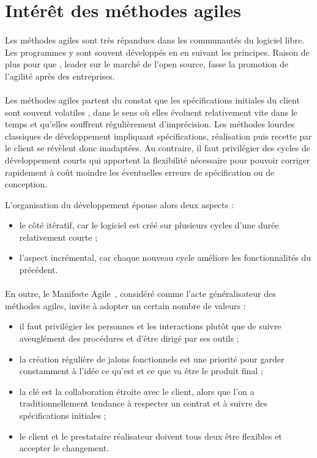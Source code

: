 \section{Intérêt des méthodes agiles}

\paragraph{}
Les méthodes agiles sont très répandues dans les communautés du logiciel libre.
Les programmes y sont souvent développés en en suivant les principes.
Raison de plus pour que \asmile{}, leader sur le marché de l'open source, fasse la promotion de l'agilité après des entreprises.


\paragraph{}
Les méthodes agiles partent du constat que les spécifications initiales du client sont souvent \og volatiles \fg, dans le sens où elles évoluent relativement vite dans le temps et qu'elles souffrent régulièrement d'imprécision.
Les méthodes lourdes classiques de développement impliquant spécifications, réalisation puis recette par le client se révèlent donc inadaptées.
Au contraire, il faut privilégier des cycles de développement courts qui apportent la flexibilité nécessaire pour pouvoir corriger rapidement à coût moindre les éventuelles erreurs de spécification ou de conception.

L'organisation du développement épouse alors deux aspects :

\begin{itemize}
	\item le côté itératif, car le logiciel est créé sur plusieurs cycles d'une durée relativement courte ;
	\item l'aspect incrémental, car chaque nouveau cycle améliore les fonctionnalités du précédent.
\end{itemize}


\paragraph{}
En outre, le Manifeste Agile~\cite{agile}, considéré comme l'acte généralisateur des méthodes agiles, invite à adopter un certain nombre de valeurs :

\begin{itemize}
	\item il faut privilégier les personnes et les interactions plutôt que de suivre aveuglément des procédures et d'être dirigé par ses outils ;
	\item la création régulière de jalons fonctionnels est une priorité pour garder cons\-tam\-ment à l'idée ce qu'est et ce que va être le produit final ;
	\item la clé est la collaboration étroite avec le client, alors que l'on a traditionnellement tendance à respecter un contrat et à suivre des spécifications initiales ;
	\item le client et le prestataire réalisateur doivent tous deux être flexibles et accepter le changement.
\end{itemize}


